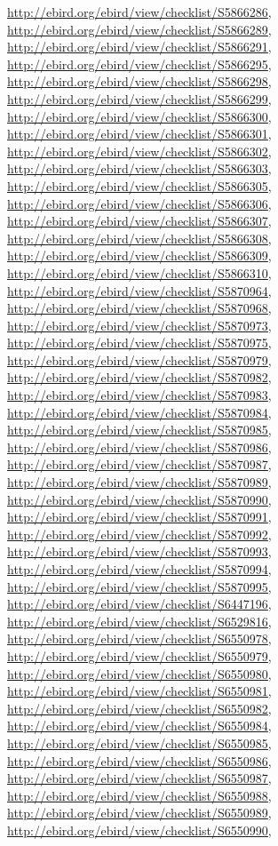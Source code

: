 \documentclass[9pt, article]{memoir}
\begin{document}
\begin{multicols}{2}
\url{http://ebird.org/ebird/view/checklist/S5866286}, 
\url{http://ebird.org/ebird/view/checklist/S5866289}, 
\url{http://ebird.org/ebird/view/checklist/S5866291}, 
\url{http://ebird.org/ebird/view/checklist/S5866295}, 
\url{http://ebird.org/ebird/view/checklist/S5866298}, 
\url{http://ebird.org/ebird/view/checklist/S5866299}, 
\url{http://ebird.org/ebird/view/checklist/S5866300}, 
\url{http://ebird.org/ebird/view/checklist/S5866301}, 
\url{http://ebird.org/ebird/view/checklist/S5866302}, 
\url{http://ebird.org/ebird/view/checklist/S5866303}, 
\url{http://ebird.org/ebird/view/checklist/S5866305}, 
\url{http://ebird.org/ebird/view/checklist/S5866306}, 
\url{http://ebird.org/ebird/view/checklist/S5866307}, 
\url{http://ebird.org/ebird/view/checklist/S5866308}, 
\url{http://ebird.org/ebird/view/checklist/S5866309}, 
\url{http://ebird.org/ebird/view/checklist/S5866310}, 
\url{http://ebird.org/ebird/view/checklist/S5870964}, 
\url{http://ebird.org/ebird/view/checklist/S5870968}, 
\url{http://ebird.org/ebird/view/checklist/S5870973}, 
\url{http://ebird.org/ebird/view/checklist/S5870975}, 
\url{http://ebird.org/ebird/view/checklist/S5870979}, 
\url{http://ebird.org/ebird/view/checklist/S5870982}, 
\url{http://ebird.org/ebird/view/checklist/S5870983}, 
\url{http://ebird.org/ebird/view/checklist/S5870984}, 
\url{http://ebird.org/ebird/view/checklist/S5870985}, 
\url{http://ebird.org/ebird/view/checklist/S5870986}, 
\url{http://ebird.org/ebird/view/checklist/S5870987}, 
\url{http://ebird.org/ebird/view/checklist/S5870989}, 
\url{http://ebird.org/ebird/view/checklist/S5870990}, 
\url{http://ebird.org/ebird/view/checklist/S5870991}, 
\url{http://ebird.org/ebird/view/checklist/S5870992}, 
\url{http://ebird.org/ebird/view/checklist/S5870993}, 
\url{http://ebird.org/ebird/view/checklist/S5870994}, 
\url{http://ebird.org/ebird/view/checklist/S5870995}, 
\url{http://ebird.org/ebird/view/checklist/S6447196}, 
\url{http://ebird.org/ebird/view/checklist/S6529816}, 
\url{http://ebird.org/ebird/view/checklist/S6550978}, 
\url{http://ebird.org/ebird/view/checklist/S6550979}, 
\url{http://ebird.org/ebird/view/checklist/S6550980}, 
\url{http://ebird.org/ebird/view/checklist/S6550981}, 
\url{http://ebird.org/ebird/view/checklist/S6550982}, 
\url{http://ebird.org/ebird/view/checklist/S6550984}, 
\url{http://ebird.org/ebird/view/checklist/S6550985}, 
\url{http://ebird.org/ebird/view/checklist/S6550986}, 
\url{http://ebird.org/ebird/view/checklist/S6550987}, 
\url{http://ebird.org/ebird/view/checklist/S6550988}, 
\url{http://ebird.org/ebird/view/checklist/S6550989}, 
\url{http://ebird.org/ebird/view/checklist/S6550990}, 

\end{multicols}
\end{document}
